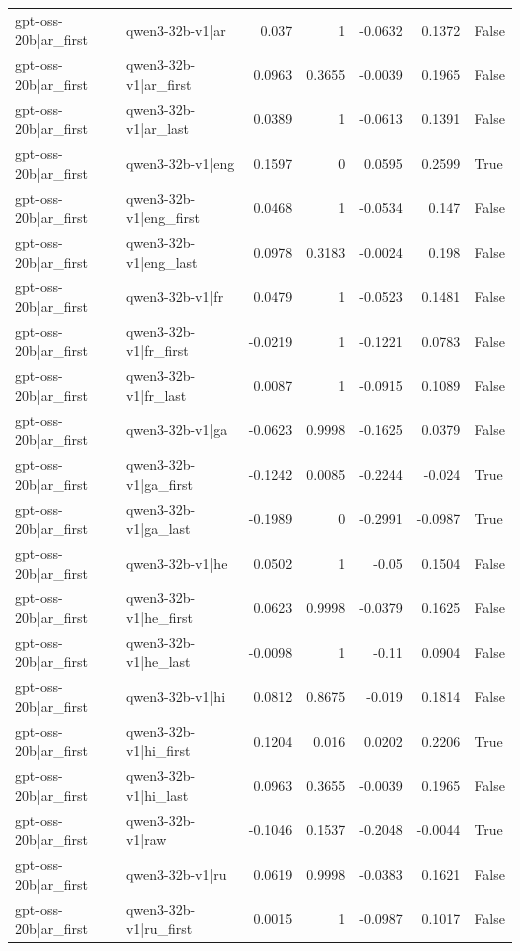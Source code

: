 \begin{table}
\begin{tabular}{l l r r r r l}
gpt-oss-20b|ar_first & qwen3-32b-v1|ar & 0.037 & 1 & -0.0632 & 0.1372 & False \\
gpt-oss-20b|ar_first & qwen3-32b-v1|ar_first & 0.0963 & 0.3655 & -0.0039 & 0.1965 & False \\
gpt-oss-20b|ar_first & qwen3-32b-v1|ar_last & 0.0389 & 1 & -0.0613 & 0.1391 & False \\
gpt-oss-20b|ar_first & qwen3-32b-v1|eng & 0.1597 & 0 & 0.0595 & 0.2599 & True \\
gpt-oss-20b|ar_first & qwen3-32b-v1|eng_first & 0.0468 & 1 & -0.0534 & 0.147 & False \\
gpt-oss-20b|ar_first & qwen3-32b-v1|eng_last & 0.0978 & 0.3183 & -0.0024 & 0.198 & False \\
gpt-oss-20b|ar_first & qwen3-32b-v1|fr & 0.0479 & 1 & -0.0523 & 0.1481 & False \\
gpt-oss-20b|ar_first & qwen3-32b-v1|fr_first & -0.0219 & 1 & -0.1221 & 0.0783 & False \\
gpt-oss-20b|ar_first & qwen3-32b-v1|fr_last & 0.0087 & 1 & -0.0915 & 0.1089 & False \\
gpt-oss-20b|ar_first & qwen3-32b-v1|ga & -0.0623 & 0.9998 & -0.1625 & 0.0379 & False \\
gpt-oss-20b|ar_first & qwen3-32b-v1|ga_first & -0.1242 & 0.0085 & -0.2244 & -0.024 & True \\
gpt-oss-20b|ar_first & qwen3-32b-v1|ga_last & -0.1989 & 0 & -0.2991 & -0.0987 & True \\
gpt-oss-20b|ar_first & qwen3-32b-v1|he & 0.0502 & 1 & -0.05 & 0.1504 & False \\
gpt-oss-20b|ar_first & qwen3-32b-v1|he_first & 0.0623 & 0.9998 & -0.0379 & 0.1625 & False \\
gpt-oss-20b|ar_first & qwen3-32b-v1|he_last & -0.0098 & 1 & -0.11 & 0.0904 & False \\
gpt-oss-20b|ar_first & qwen3-32b-v1|hi & 0.0812 & 0.8675 & -0.019 & 0.1814 & False \\
gpt-oss-20b|ar_first & qwen3-32b-v1|hi_first & 0.1204 & 0.016 & 0.0202 & 0.2206 & True \\
gpt-oss-20b|ar_first & qwen3-32b-v1|hi_last & 0.0963 & 0.3655 & -0.0039 & 0.1965 & False \\
gpt-oss-20b|ar_first & qwen3-32b-v1|raw & -0.1046 & 0.1537 & -0.2048 & -0.0044 & True \\
gpt-oss-20b|ar_first & qwen3-32b-v1|ru & 0.0619 & 0.9998 & -0.0383 & 0.1621 & False \\
gpt-oss-20b|ar_first & qwen3-32b-v1|ru_first & 0.0015 & 1 & -0.0987 & 0.1017 & False \\

\end{tabular}
\end{table}
